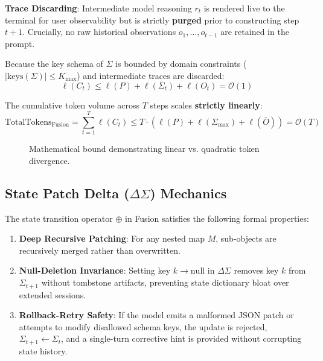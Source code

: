 \noindent\textbf{Trace Discarding}: Intermediate model reasoning $r_t$ is rendered live to the terminal for user observability but is strictly \textbf{purged} prior to constructing step $t+1$. Crucially, no raw historical observations $o_1, \dots, o_{t-1}$ are retained in the prompt.

Because the key schema of $\Sigma$ is bounded by domain constraints ($|\text{keys}(\Sigma)| \le K_{\text{max}}$) and intermediate traces are discarded:
\begin{equation}
\ell(C_t) \le \ell(P) + \ell(\Sigma_t) + \ell(O_t) = \mathcal{O}(1)
\end{equation}

The cumulative token volume across $T$ steps scales \textbf{strictly linearly}:
\begin{equation}
\label{eq:fusion_cost}
\text{TotalTokens}_{\text{Fusion}} = \sum_{t=1}^T \ell(C_t) \le T \cdot \left( \ell(P) + \ell(\Sigma_{\text{max}}) + \ell(\bar{O}) \right) = \mathcal{O}(T)
\end{equation}

\begin{figure}[t]
\centering
{}
\caption{Mathematical bound demonstrating linear vs. quadratic token divergence.}
\label{fig:theorem}
\end{figure}

\subsection{State Patch Delta ($\Delta\Sigma$) Mechanics}
The state transition operator $\oplus$ in Fusion satisfies the following formal properties:
\begin{enumerate}
    \item \textbf{Deep Recursive Patching}: For any nested map $M$, sub-objects are recursively merged rather than overwritten.
    \item \textbf{Null-Deletion Invariance}: Setting key $k \to \text{null}$ in $\Delta\Sigma$ removes key $k$ from $\Sigma_{t+1}$ without tombstone artifacts, preventing state dictionary bloat over extended sessions.
    \item \textbf{Rollback-Retry Safety}: If the model emits a malformed JSON patch or attempts to modify disallowed schema keys, the update is rejected, $\Sigma_{t+1} \gets \Sigma_t$, and a single-turn corrective hint is provided without corrupting state history.
\end{enumerate}
